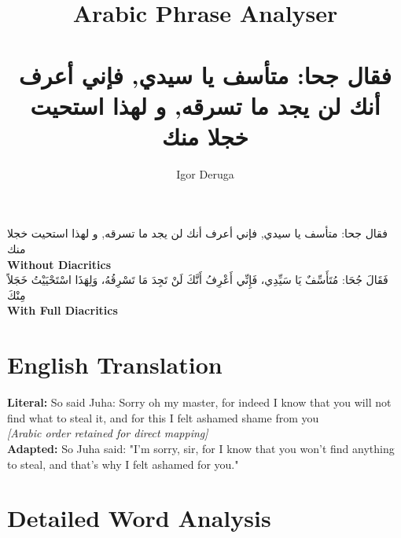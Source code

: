 \documentclass[a4paper,12pt]{article}
\begin{document}
\title{\textbf{\Large Arabic Phrase Analyser}\\
\\
\normalsize \textarabic{فقال جحا: متأسف يا سيدي, فإني أعرف أنك لن يجد ما تسرقه, و لهذا استحيت خجلا منك}}
\author{Igor Deruga}
\date{}
\maketitle

\begin{tcolorbox}[colback=boxcolor,colframe=headercolor,title=\textbf{Arabic Phrase}]
\centering
\textarabic{فقال جحا: متأسف يا سيدي, فإني أعرف أنك لن يجد ما تسرقه, و لهذا استحيت خجلا منك}
\\[0.5em]
\textbf{Without Diacritics}
\\[1em]
\textarabic{فَقَالَ جُحَا: مُتَأَسِّفٌ يَا سَيِّدِي، فَإِنِّي أَعْرِفُ أَنَّكَ لَنْ تَجِدَ مَا تَسْرِقُهُ، وَلِهَذَا اسْتَحْيَيْتُ خَجَلاً مِنْكَ}
\\[0.5em]
\textbf{With Full Diacritics}
\end{tcolorbox}

\section{English Translation}
\begin{tcolorbox}[colback=white,colframe=accentcolor]
\textbf{Literal:} So said Juha: Sorry oh my master, for indeed I know that you will not find what to steal it, and for this I felt ashamed shame from you \\
\textit{[Arabic order retained for direct mapping]}\\[0.5em]
\textbf{Adapted:} So Juha said: "I'm sorry, sir, for I know that you won't find anything to steal, and that's why I felt ashamed for you."
\end{tcolorbox}

\section{Detailed Word Analysis}
\end{document}
